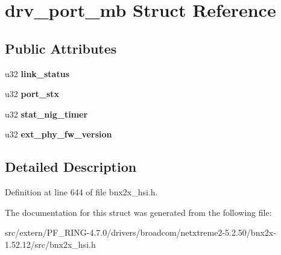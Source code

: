 \hypertarget{structdrv__port__mb}{
\section{drv\_\-port\_\-mb Struct Reference}
\label{structdrv__port__mb}
}
\subsection*{Public Attributes}
\begin{DoxyCompactItemize}
\item 
\hypertarget{structdrv__port__mb_aecfcb87e82b7844c09e25072d5832014}{
u32 {\bfseries link\_\-status}}
\label{structdrv__port__mb_aecfcb87e82b7844c09e25072d5832014}

\item 
\hypertarget{structdrv__port__mb_abcd5a6d189bec9abc1de3be705ef5d6a}{
u32 {\bfseries port\_\-stx}}
\label{structdrv__port__mb_abcd5a6d189bec9abc1de3be705ef5d6a}

\item 
\hypertarget{structdrv__port__mb_a47e6f91bf08cf83f18961de6da65a25a}{
u32 {\bfseries stat\_\-nig\_\-timer}}
\label{structdrv__port__mb_a47e6f91bf08cf83f18961de6da65a25a}

\item 
\hypertarget{structdrv__port__mb_affe9f9fb5577fe0c726e28b822011bac}{
u32 {\bfseries ext\_\-phy\_\-fw\_\-version}}
\label{structdrv__port__mb_affe9f9fb5577fe0c726e28b822011bac}

\end{DoxyCompactItemize}


\subsection{Detailed Description}


Definition at line 644 of file bnx2x\_\-hsi.h.



The documentation for this struct was generated from the following file:\begin{DoxyCompactItemize}
\item 
src/extern/PF\_\-RING-\/4.7.0/drivers/broadcom/netxtreme2-\/5.2.50/bnx2x-\/1.52.12/src/bnx2x\_\-hsi.h\end{DoxyCompactItemize}
